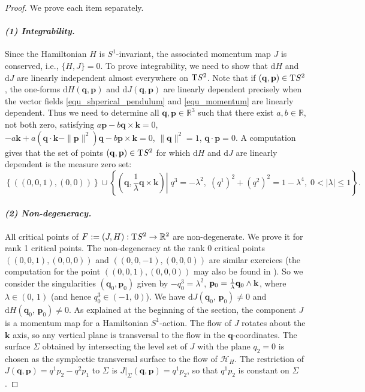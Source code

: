 \documentclass[11pt]{article}
\newcommand{\DD}{\mathrm{d}}
\renewcommand{\leq}{\leqslant}
\begin{document}
\begin{proof}
  We prove each item separately.

  \paragraph{{\em {\rm (1)} Integrability.}} Since the Hamiltonian $H$
  is $S^1$-invariant, the associated momentum map $J $ is conserved,
  i.e., $\{H, J\} =0$. To prove integrability, we need to show that
  $\DD H $ and $\DD J $ are linearly independent almost everywhere on
  ${\rm T}S^2$. Note that if $(\mathbf{q},\mathbf{p})\in {\rm T}S^2$,
  the one-forms $\DD H(\mathbf{q},\mathbf{p})$ and $\DD
  J(\mathbf{q},\mathbf{p})$ are linearly dependent precisely when the
  vector fields \eqref{equ_shperical_pendulum} and
  \eqref{equ_momentum} are linearly dependent. Thus we need to
  determine all $\mathbf{q}, \mathbf{p}\in \mathbb{R}^3$ such that
  there exist $a,b \in \mathbb{R}$, not both zero, satisfying
  $a\mathbf{p} - b \mathbf{q}\times\mathbf{k} = 0$, $-a \mathbf{k} +
  a\left(\mathbf{q}\cdot\mathbf{k} - \|\mathbf{p}\|^2\right)\mathbf{q}
  - b \mathbf{p}\times \mathbf{k} =0$, $\|\mathbf{q}\|^2 = 1$,
  $\mathbf{q}\cdot \mathbf{p}=0$.  A computation gives that the set of
  points $(\mathbf{q}, \mathbf{p}) \in {\rm T}S^2$ for which $\DD H $
  and $\DD J $ are linearly dependent is the measure zero set:
  \begin{equation}
    \label{critical_points}
    \left\{((0,0,1), (0,0))\right\}\cup
    \left\{\left.\left(\mathbf{q}, \frac{1}{\lambda} \mathbf{q}
          \times \mathbf{k}\right) \right|\; q^3=- \lambda^2,\; 
      (q^1)^2 + (q^2)^2 = 1 - \lambda^4, \; 0<|\lambda|\leq 1\right\}.
  \end{equation}

  \paragraph{{\em {\rm (2)} Non-degeneracy.}} All critical points of
  $F:=(J,H): {\rm T}S^2 \rightarrow \mathbb{R}^2$ are
  non-degenerate. We prove it for rank 1 critical points.  The
  non-degeneracy at the rank 0 critical points $((0,0,1),(0,0,0))$ and
  $((0,0,-1),(0,0,0))$ are similar exercices (the computation for the
  point $((0,0,1), (0,0,0))$ may also be found in \cite{san-mono}). So
  we consider the singularities $(\mathbf{q}_0,\mathbf{p}_0)$ given by
  $-q^3_0=\lambda^2$, $\mathbf{p}_0= \frac{1}{\lambda}\mathbf{q}_0
  \wedge {\bf k}$, where $\lambda \in (0,\,1)$ (and hence $q^3_0 \in
  (-1,\,0)$).  We have $\DD J(\mathbf{q}_0,\,\mathbf{p}_0) \neq 0$ and
  $\DD H(\mathbf{q}_0,\,\mathbf{p}_0) \neq 0$.  As explained at the
  beginning of the section, the component $J$ is a momentum map for a
  Hamiltonian $S^1$-action. The flow of $J$ rotates about the
  $\mathbf{k}$ axis, so any vertical plane is transversal to the flow
  in the $\mathbf{q}$-coordinates.  The surface $\Sigma$ obtained by
  intersecting the level set of $J$ with the plane $q_2=0$ is chosen
  as the symplectic transversal surface to the flow of
  $\mathcal{H}_H$. The restriction of $J(\mathbf{q}, \mathbf{p})
  =q^1p_2 - q^2p_1$ to $\Sigma$ is $J|_{\Sigma}(\mathbf{q},
  \mathbf{p})=q^1p_2$, so that $q^1p_2$ is constant on $\Sigma$.


\end{proof}
\end{document}
